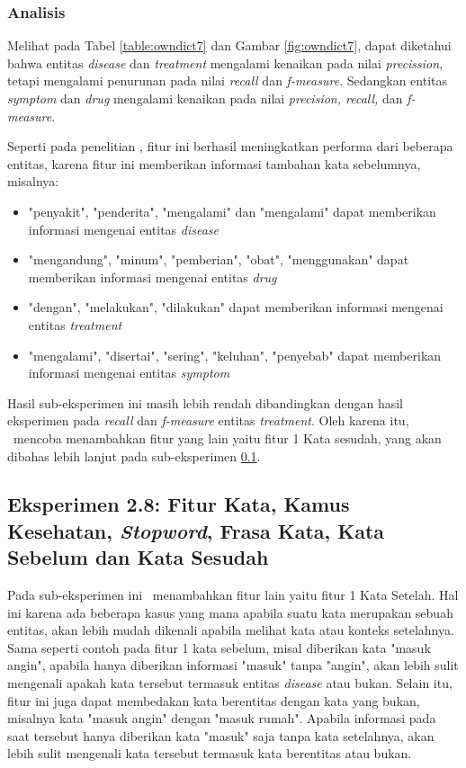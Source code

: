 	\subsubsection{Analisis}
	Melihat pada Tabel \ref{table:owndict7} dan Gambar \ref{fig:owndict7}, dapat diketahui bahwa entitas \textit{disease} dan \textit{treatment} mengalami kenaikan pada nilai \textit{precission}, tetapi mengalami penurunan pada nilai \textit{recall} dan \textit{f-measure}. Sedangkan entitas \textit{symptom} dan \textit{drug} mengalami kenaikan pada nilai \textit{precision, recall,} dan \textit{f-measure}.
	
	Seperti pada penelitian \cite{skripsiKakRadit}, fitur ini berhasil meningkatkan performa dari beberapa entitas, karena fitur ini memberikan informasi tambahan kata sebelumnya, misalnya:
	\begin{itemize}
		\item "penyakit", "penderita", "mengalami" dan "mengalami" dapat memberikan informasi mengenai entitas \textit{disease}
		\item "mengandung", "minum", "pemberian", "obat", "menggunakan" dapat memberikan informasi mengenai entitas \textit{drug}
		\item "dengan", "melakukan", "dilakukan" dapat memberikan informasi mengenai entitas \textit{treatment}
		\item "mengalami", "disertai", "sering", "keluhan", "penyebab" dapat memberikan informasi mengenai entitas \textit{symptom}
	\end{itemize}
	
	Hasil sub-eksperimen ini masih lebih rendah dibandingkan dengan hasil eksperimen \cite{skripsiKakRadit} pada \textit{recall} dan \textit{f-measure} entitas \textit{treatment}. Oleh karena itu, \saya~mencoba menambahkan fitur yang lain yaitu fitur 1 Kata sesudah, yang akan dibahas lebih lanjut pada sub-eksperimen \ref{eks:subekswaf1}.
	
	
	\subsection{Eksperimen 2.8: Fitur Kata, Kamus Kesehatan, \textit{Stopword}, Frasa Kata, Kata Sebelum dan Kata Sesudah}\label{eks:subekswaf1}
	Pada sub-eksperimen ini \saya~menambahkan fitur lain yaitu fitur 1 Kata Setelah. Hal ini karena ada beberapa kasus yang mana apabila suatu kata merupakan sebuah entitas, akan lebih mudah dikenali apabila melihat kata atau konteks setelahnya. Sama seperti contoh pada fitur 1 kata sebelum, misal diberikan kata "masuk angin", apabila hanya diberikan informasi "masuk" tanpa "angin", akan lebih sulit mengenali apakah kata tersebut termasuk entitas \textit{disease} atau bukan. Selain itu, fitur ini juga dapat membedakan kata berentitas dengan kata yang bukan, misalnya kata "masuk angin" dengan "masuk rumah". Apabila informasi pada saat tersebut hanya diberikan kata "masuk" saja tanpa kata setelahnya, akan lebih sulit mengenali kata tersebut termasuk kata berentitas atau bukan.
	
